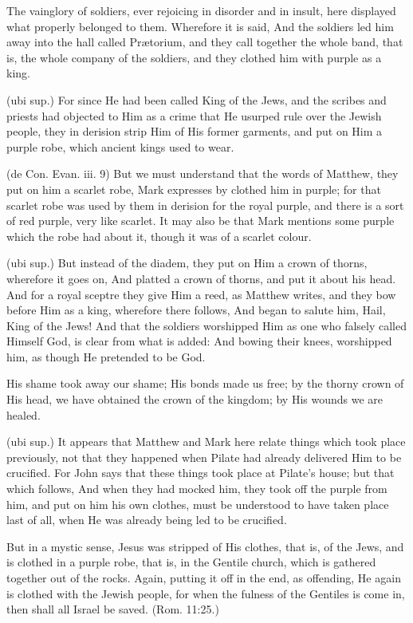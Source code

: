  The vainglory of soldiers, ever rejoicing in disorder and in insult, here displayed what properly belonged to them. Wherefore it is said, And the soldiers led him away into the hall called Prætorium, and they call together the whole band, that is, the whole company of the soldiers, and they clothed him with purple as a king.

 (ubi sup.) For since He had been called King of the Jews, and the scribes and priests had objected to Him as a crime that He usurped rule over the Jewish people, they in derision strip Him of His former garments, and put on Him a purple robe, which ancient kings used to wear.

 (de Con. Evan. iii. 9) But we must understand that the words of Matthew, they put on him a scarlet robe, Mark expresses by clothed him in purple; for that scarlet robe was used by them in derision for the royal purple, and there is a sort of red purple, very like scarlet. It may also be that Mark mentions some purple which the robe had about it, though it was of a scarlet colour.

 (ubi sup.) But instead of the diadem, they put on Him a crown of thorns, wherefore it goes on, And platted a crown of thorns, and put it about his head. And for a royal sceptre they give Him a reed, as Matthew writes, and they bow before Him as a king, wherefore there follows, And began to salute him, Hail, King of the Jews! And that the soldiers worshipped Him as one who falsely called Himself God, is clear from what is added: And bowing their knees, worshipped him, as though He pretended to be God.

 His shame took away our shame; His bonds made us free; by the thorny crown of His head, we have obtained the crown of the kingdom; by His wounds we are healed.

 (ubi sup.) It appears that Matthew and Mark here relate things which took place previously, not that they happened when Pilate had already delivered Him to be crucified. For John says that these things took place at Pilate’s house; but that which follows, And when they had mocked him, they took off the purple from him, and put on him his own clothes, must be understood to have taken place last of all, when He was already being led to be crucified.

 But in a mystic sense, Jesus was stripped of His clothes, that is, of the Jews, and is clothed in a purple robe, that is, in the Gentile church, which is gathered together out of the rocks. Again, putting it off in the end, as offending, He again is clothed with the Jewish people, for when the fulness of the Gentiles is come in, then shall all Israel be saved. (Rom. 11:25.)

